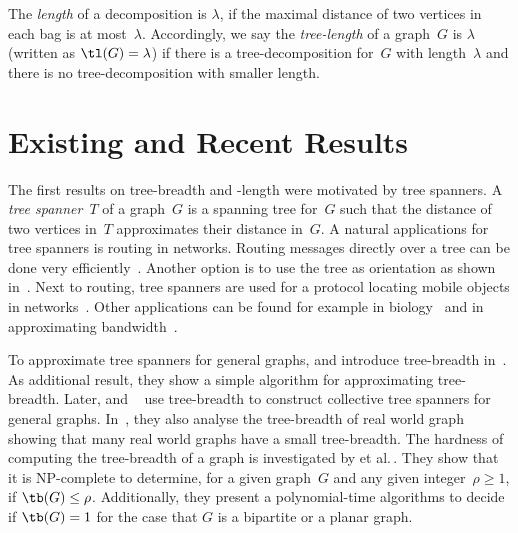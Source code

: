 The \emph{length} of a decomposition is $\lambda$, if the maximal distance of two vertices in each bag is at most~$\lambda$.
Accordingly, we say the \emph{tree-length} of a graph~$G$ is $\lambda$ (written as $\tl(G) = \lambda$) if there is a tree-decomposition for~$G$ with length~$\lambda$ and there is no tree-decomposition with smaller length.

\section{Existing and Recent Results}

The first results on tree-breadth and -length were motivated by tree spanners.
A \emph{tree spanner}~$T$ of a graph~$G$ is a spanning tree for~$G$ such that the distance of two vertices in~$T$ approximates their distance in~$G$.
A natural applications for tree spanners is routing in networks.
Routing messages directly over a tree can be done very efficiently~\cite{ThorupZwick2001}.
Another option is to use the tree as orientation as shown in~\cite{DraganMatama2011}.
Next to routing, tree spanners are used for a protocol locating mobile objects in networks~\cite{PelegReshef2001}.
Other applications can be found for example in biology~\cite{BandelDress1986} and in approximating bandwidth~\cite{VenRotMadMak1997}.

To approximate tree spanners for general graphs,  and  introduce tree-breadth in~\cite{DraganKohler2014}.
As additional result, they show a simple algorithm for approximating tree-breadth.
Later,  and ~\cite{DraganAbuAta2014} use tree-breadth to construct collective tree spanners for general graphs.
In~\cite{AbuAtaDragan2016}, they also analyse the tree-breadth of real world graph showing that many real world graphs have a small tree-breadth.
The hardness of computing the tree-breadth of a graph is investigated by  et al.\,\cite{DucoLegaNiss2016}.
They show that it is NP-complete to determine, for a given graph~$G$ and any given integer~$\rho \geq 1$, if $\tb(G) \leq \rho$.
Additionally, they present a polynomial-time algorithms to decide if $\tb(G) = 1$ for the case that $G$ is a bipartite or a planar graph.

